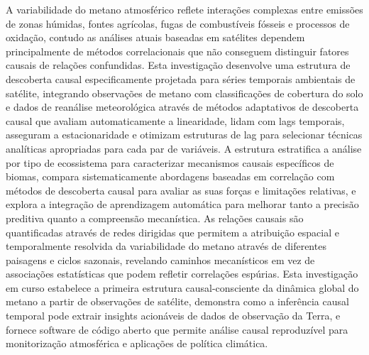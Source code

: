 \acresetall
\noindent A variabilidade do metano atmosférico reflete interações complexas entre emissões de zonas húmidas, fontes agrícolas, fugas de combustíveis fósseis e processos de oxidação, contudo as análises atuais baseadas em satélites dependem principalmente de métodos correlacionais que não conseguem distinguir fatores causais de relações confundidas. Esta investigação desenvolve uma estrutura de descoberta causal especificamente projetada para séries temporais ambientais de satélite, integrando observações de metano com classificações de cobertura do solo e dados de reanálise meteorológica através de métodos adaptativos de descoberta causal que avaliam automaticamente a linearidade, lidam com lags temporais, asseguram a estacionaridade e otimizam estruturas de lag para selecionar técnicas analíticas apropriadas para cada par de variáveis. A estrutura estratifica a análise por tipo de ecossistema para caracterizar mecanismos causais específicos de biomas, compara sistematicamente abordagens baseadas em correlação com métodos de descoberta causal para avaliar as suas forças e limitações relativas, e explora a integração de aprendizagem automática para melhorar tanto a precisão preditiva quanto a compreensão mecanística. As relações causais são quantificadas através de redes dirigidas que permitem a atribuição espacial e temporalmente resolvida da variabilidade do metano através de diferentes paisagens e ciclos sazonais, revelando caminhos mecanísticos em vez de associações estatísticas que podem refletir correlações espúrias. Esta investigação em curso estabelece a primeira estrutura causal-consciente da dinâmica global do metano a partir de observações de satélite, demonstra como a inferência causal temporal pode extrair insights acionáveis de dados de observação da Terra, e fornece software de código aberto que permite análise causal reproduzível para monitorização atmosférica e aplicações de política climática.